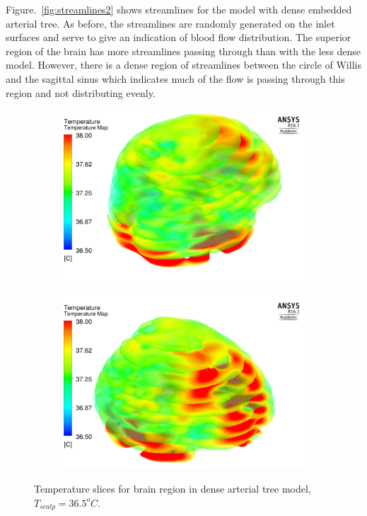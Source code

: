\documentclass[11pt,english,a4paper,twoside,openright]{report}
\begin{document}
{{{{{{{{Figure.~\ref{fig:streamlines2} shows streamlines for the model with dense embedded arterial tree. As before, the streamlines are randomly generated on the inlet surfaces and serve to give an indication of blood flow distribution. The superior region of the brain has more streamlines passing through than with the less dense model. However, there is a dense region of streamlines between the circle of Willis and the sagittal sinus which indicates much of the flow is passing through this region and not distributing evenly. 

\begin{figure}[h]
	\centering
	\begin{subfigure}[b]{0.45\textwidth}
		\includegraphics[width=\textwidth]{3DFullVessels/temperatureVolume2a}
	\end{subfigure}
	\begin{subfigure}[b]{0.45\textwidth}
		\includegraphics[width=\textwidth]{3DFullVessels/temperatureVolume2b}
	\end{subfigure}
	\caption[Temperature slices for brain region in dense arterial tree model, $T_{scalp}=36.5^{o}C$]{Temperature slices for brain region in dense arterial tree model, $T_{scalp}=36.5^{o}C$.}
	\label{fig:temperatureVolume2}
\end{figure}

}}}}}}}}
\end{document}

